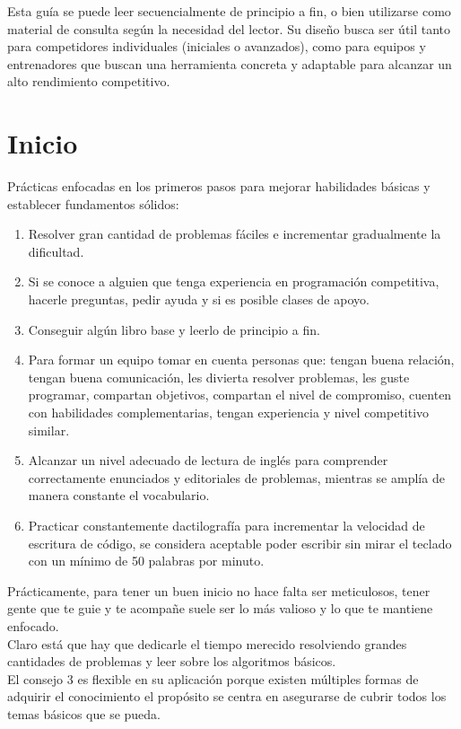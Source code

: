 Esta guía se puede leer secuencialmente de principio a fin, o bien utilizarse como material de consulta según la necesidad del lector. Su diseño busca ser útil tanto para competidores individuales (iniciales o avanzados), como para equipos y entrenadores que buscan una herramienta concreta y adaptable para alcanzar un alto rendimiento competitivo.
\pagebreak
\section{Inicio}
Prácticas enfocadas en los primeros pasos para mejorar habilidades básicas y establecer fundamentos sólidos:
\begin{enumerate}[series=icpc, label=\arabic*., leftmargin=*, itemsep=0.3em]
    \item Resolver gran cantidad de problemas fáciles e incrementar gradualmente la dificultad.
    \item Si se conoce a alguien que tenga experiencia en programación competitiva, hacerle preguntas, pedir ayuda y si es posible clases de apoyo.
    \item Conseguir algún libro base y leerlo de principio a fin.
    \item Para formar un equipo tomar en cuenta personas que: tengan buena relación, tengan buena comunicación, les divierta resolver problemas, les guste programar, compartan objetivos, compartan el nivel de compromiso, cuenten con habilidades complementarias, tengan experiencia y nivel competitivo similar.
    \item Alcanzar un nivel adecuado de lectura de inglés para comprender correctamente enunciados y editoriales de problemas, mientras se amplía de manera constante el vocabulario.
    \item Practicar constantemente dactilografía para incrementar la velocidad de escritura de código, se considera aceptable poder escribir sin mirar el teclado con un mínimo de 50 palabras por minuto.
\end{enumerate}
Prácticamente, para tener un buen inicio no hace falta ser meticulosos, tener gente que te guie y te acompañe suele ser lo más valioso y lo que te mantiene enfocado.\\

Claro está que hay que dedicarle el tiempo merecido resolviendo grandes cantidades de problemas y leer sobre los algoritmos básicos.\\

El consejo 3 es flexible en su aplicación porque existen múltiples formas de adquirir el conocimiento el propósito se centra en asegurarse de cubrir todos los temas básicos que se pueda.\\

